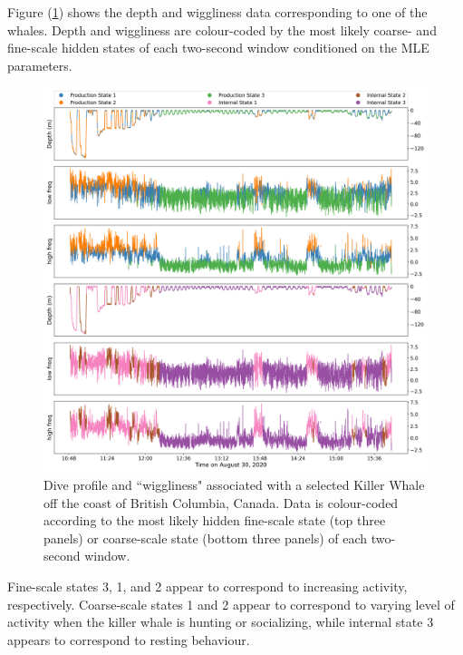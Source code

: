Figure (\ref{fig:data}) shows the depth and wiggliness data corresponding to one of the whales. Depth and wiggliness are colour-coded by the most likely coarse- and fine-scale hidden states of each two-second window conditioned on the MLE parameters.
%
\begin{figure}
    \centering
    \includegraphics[width=6.5in]{plt/decoded_dives_kw_I145_K_3_3_nWhales_8.png}
    \caption{Dive profile and ``wiggliness" associated with a selected Killer Whale off the coast of British Columbia, Canada. Data is colour-coded according to the most likely hidden fine-scale state (top three panels) or coarse-scale state (bottom three panels) of each two-second window.}
    \label{fig:data}
\end{figure}
%
Fine-scale states 3, 1, and 2 appear to correspond to increasing activity, respectively. Coarse-scale states 1 and 2 appear to correspond to varying level of activity when the killer whale is hunting or socializing, while internal state 3 appears to correspond to resting behaviour.

